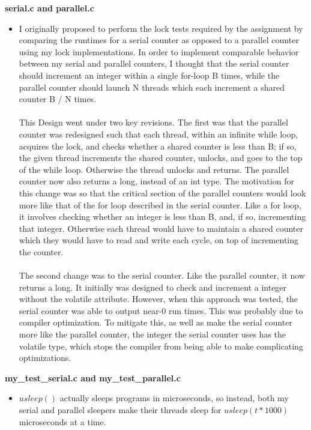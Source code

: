 \documentclass[]{article}
\begin{document}
\begin{itemize}
	\textbf{serial.c and parallel.c}
	\begin{itemize}
		\item I originally proposed to perform the lock tests required by the assignment by comparing the runtimes for a serial counter as opposed to a parallel counter using my lock implementations. In order to implement comparable behavior between my serial and parallel counters, I thought that the serial counter should increment an integer within a single for-loop B times, while the parallel counter should launch N threads which each increment a shared counter B / N times.
		\\\\
		This Design went under two key revisions. The first was that the parallel counter was redesigned such that each thread, within an infinite while loop, acquires the lock, and checks whether a shared counter is less than B; if so, the given thread increments the shared counter, unlocks, and goes to the top of the while loop. Otherwise the thread unlocks and returns. 
		The parallel counter now also returns a long, instead of an int type.
		The motivation for this change was so that the critical section of the parallel counters would look more like that of the for loop described in the serial counter. Like a for loop, it involves checking whether an integer is less than B, and, if so, incrementing that integer. Otherwise each thread would have to maintain a shared counter which they would have to read and write each cycle, on top of incrementing the counter.
		\\\\
		The second change was to the serial counter. Like the parallel counter, it now returns a long. It initially was designed to check and increment a integer without the volatile attribute. However, when this approach was tested, the serial counter was able to output near-0 run times. This was probably due to compiler optimization. To mitigate this, as well as make the serial counter more like the parallel counter, the integer the serial counter uses has the volatile type, which stops the compiler from being able to make complicating optimizations.
	\end{itemize}
	\textbf{my\_test\_serial.c and my\_test\_parallel.c}
	\begin{itemize}
		\item $usleep()$ actually sleeps programs in microseconds, so instead, both my serial and parallel sleepers make their threads sleep for $usleep(t * 1000)$ microseconds at a time.
		

\end{itemize}
\end{itemize}
\end{document}

